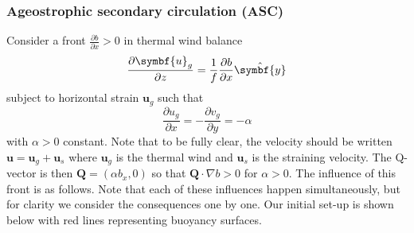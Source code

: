 \documentclass{jknotes}
\begin{document}
\subsubsection{Ageostrophic secondary circulation (ASC)}
Consider a front $\frac{\partial b}{\partial x} > 0$ in thermal wind balance
\begin{equation}
	\frac{\partial \symbf{u}_g}{\partial z} = \inv{f}\frac{\partial
	b}{\partial x}\hat{\symbf{y}}
\end{equation}
subject to horizontal strain $\symbf{u}_g$ such that
\begin{equation}
	\frac{\partial u_g}{\partial x} = -\frac{\partial v_g}{\partial y} =
	-\alpha
\end{equation}
with $\alpha > 0$ constant. Note that to be fully clear, the velocity should
be written $\symbf{u} = \symbf{u}_g + \symbf{u}_s$ where $\symbf{u}_g$ is the
thermal wind and $\symbf{u}_s$ is the straining velocity. The Q-vector is then $\symbf{Q} = (\alpha b_x, 0)$
so that $\symbf{Q} \cdot \nabla b > 0$ for $\alpha > 0$. The influence of this
front is as follows. Note that each of these influences happen simultaneously,
but for clarity we consider the consequences one by one. Our initial set-up is
shown below with red lines representing buoyancy surfaces.\\
\begin{center}
\hspace{.35in}
\end{center}
\end{document}
